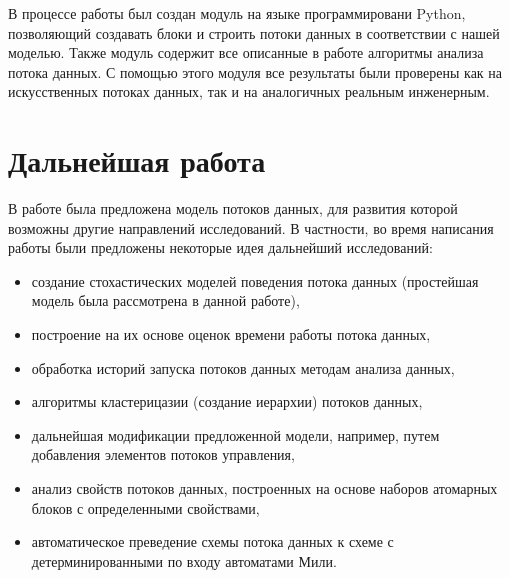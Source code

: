 \documentclass[10pt,a4paper]{article}
\begin{document}
  В процессе работы был создан модуль на языке программировани Python, позволяющий создавать блоки и строить потоки данных в соответствии с нашей моделью.
  Также модуль содержит все описанные в работе алгоритмы анализа потока данных. С помощью этого модуля все результаты были проверены как на искусственных
  потоках данных, так и на аналогичных реальным инженерным.
  
\section{Дальнейшая работа}
  В работе была предложена модель потоков данных, для развития которой возможны другие направлений исследований.
  В частности, во время написания работы были предложены некоторые идея дальнейший исследований:
  \begin{itemize}
    \item создание стохастических моделей поведения потока данных (простейшая модель была рассмотрена в данной работе),
    \item построение на их основе оценок времени работы потока данных,
    \item обработка историй запуска потоков данных методам анализа данных,
    \item алгоритмы кластерицазии (создание иерархии) потоков данных,
    \item дальнейшая модификации предложенной модели, например, путем добавления элементов потоков управления,
    \item анализ свойств потоков данных, построенных на основе наборов атомарных блоков с определенными свойствами,
    \item автоматическое преведение схемы потока данных к схеме с детерминированными по входу автоматами Мили.
  \end{itemize}

\newpage 
  
\end{document}

